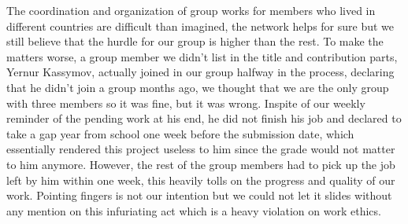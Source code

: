 \documentclass{article}
\begin{document}
The coordination and organization of group works for members who lived in different countries are difficult than imagined, the network helps for sure but we still believe that the hurdle for our group is higher than the rest. To make the matters worse, a group member we didn't list in the title and contribution parts, Yernur Kassymov, actually joined in our group halfway in the process, declaring that he didn't join a group months ago, we thought that we are the only group with three members so it was fine, but it was wrong. Inspite of our weekly reminder of the pending work at his end, he did not finish his job and declared to take a gap year from school one week before the submission date, which essentially rendered this project useless to him since the grade would not matter to him anymore. However, the rest of the group members had to pick up the job left by him within one week, this heavily tolls on the progress and quality of our work. Pointing fingers is not our intention but we could not let it slides without any mention on this infuriating act which is a heavy violation on work ethics.
\end{document}
